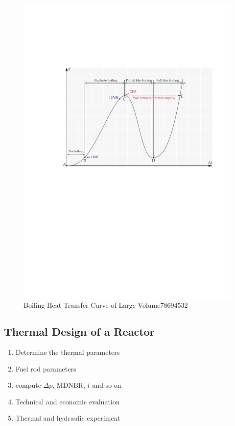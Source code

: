 \begin{figure}[H]
    \centering
    \includegraphics[scale=0.6]{figures/boiling_curve.pdf}
    \caption{Boiling Heat Transfer Curve of Large Volume78694532 }
\end{figure}

\subsection{Thermal Design of a Reactor}

\begin{enumerate}
    \item Determine the thermal parameters
    \item Fuel rod parameters
    \item compute $\Delta p$, MDNBR, $t$ and so on
    \item Technical and economic evaluation
    \item Thermal and hydraulic experiment
\end{enumerate}